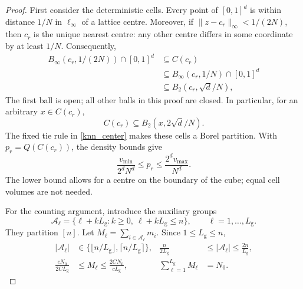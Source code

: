 \documentclass[twoside,11pt]{article}
\newenvironment{revision}{\color{revisionred}}{}
\begin{document}
\begin{revision}
\begin{proof}
First consider the deterministic cells. Every point of $[0,1]^d$
is within distance $1/N$ in $\ell_\infty$ of a lattice centre.
Moreover, if $\|z-c_r\|_\infty<1/(2N)$, then $c_r$ is the unique
nearest centre: any other centre differs in some coordinate by
at least $1/N$. Consequently,
\begin{equation}
\label{eq:292}
\begin{aligned}
B_\infty(c_r,1/(2N))\cap[0,1]^d
&\subseteq C(c_r)\\
&\subseteq B_\infty(c_r,1/N)\cap[0,1]^d\\
&\subseteq B_2(c_r,\sqrt d/N),
\end{aligned}
\end{equation}
The first ball is open; all other balls in this proof are closed.
In particular, for an arbitrary $x\in C(c_r)$,
\[
C(c_r)\subseteq B_2(x,2\sqrt d/N).
\]
The fixed tie rule in
\eqref{knn_center} makes these cells a Borel partition. With
$p_r=Q(C(c_r))$, the density bounds give
\begin{equation}
\label{eq_knn_cell_mass}
\frac{v_{\min}}{2^dN^d}\leq p_r
\leq\frac{2^d v_{\max}}{N^d}.
\end{equation}
The lower bound allows for a centre on the boundary of the cube;
equal cell volumes are not needed.

For the counting argument, introduce the auxiliary groups
\[
\mathcal A_\ell
=\{\ell+kL_{\mathrm g}:k\geq0,\ \ell+kL_{\mathrm g}\leq n\},
\qquad \ell=1,\ldots,L_{\mathrm g}.
\]
They partition $[n]$. Let $M_\ell=\sum_{i\in\mathcal A_\ell}m_i$.
Since $1\leq L_{\mathrm g}\leq n$,
\begin{align}
\label{eq_knn_geometry_group_sizes}
|\mathcal A_\ell|
&\in\{\lfloor n/L_{\mathrm g}\rfloor,
       \lceil n/L_{\mathrm g}\rceil\},&
\frac{n}{2L_{\mathrm g}}
&\leq|\mathcal A_\ell|\leq\frac{2n}{L_{\mathrm g}},\\
\frac{cN_0}{2CL_{\mathrm g}}
&\leq M_\ell\leq\frac{2CN_0}{cL_{\mathrm g}},&
\sum_{\ell=1}^{L_{\mathrm g}}M_\ell&=N_0.
\nonumber
\end{align}


\end{proof}
\end{revision}
\end{document}
